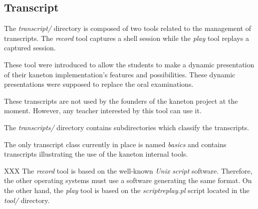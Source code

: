 %
%
%
%
%
%

%
%

\subsection{Transcript}
\label{section:transcript}

The \textit{transcript/} directory is composed of two tools related to
the management of transcripts. The \textit{record} tool captures a
shell session while the \textit{play} tool replays a captured session.

These tool were introduced to allow the students to make a dynamic presentation
of their kaneton implementation's features and possibilities. These dynamic
presentations were supposed to replace the oral examinations.

These transcripts are not used by the founders of the kaneton project at
the moment. However, any teacher interested by this tool can use it.

The \textit{transcripts/} directory contains subdirectories which classify
the transcripts.

The only transcript class currently in place is named \textit{basics} and
contains transcripts illustrating the use of the kaneton internal tools.

XXX
The \textit{record} tool is based on the well-known \textit{Unix}
\textit{script} software. Therefore, the other operating systems must use
a software generating the same format. On the other hand, the \textit{play}
tool is based on the \textit{scriptreplay.pl} script located in the
\textit{tool/} directory.
